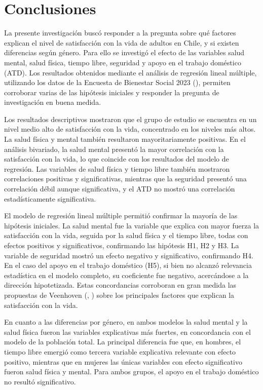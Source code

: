 \documentclass[
  spanish,
  a4paper,
  oneside]{scrbook}
\begin{document}

\chapter{Conclusiones}\label{conclusiones}

La presente investigación buscó responder a la pregunta sobre qué
factores explican el nivel de satisfacción con la vida de adultos en
Chile, y si existen diferencias según género. Para ello se investigó el
efecto de las variables salud mental, salud física, tiempo libre,
seguridad y apoyo en el trabajo doméstico (ATD). Los resultados
obtenidos mediante el análisis de regresión lineal múltiple, utilizando
los datos de la Encuesta de Bienestar Social 2023
(), permiten corroborar varias de las hipótesis iniciales y
responder la pregunta de investigación en buena medida.

Los resultados descriptivos mostraron que el grupo de estudio se
encuentra en un nivel medio alto de satisfacción con la vida,
concentrado en los niveles más altos. La salud física y mental también
resultaron mayoritariamente positivas. En el análisis bivariado, la
salud mental presentó la mayor correlación con la satisfacción con la
vida, lo que coincide con los resultados del modelo de regresión. Las
variables de salud física y tiempo libre también mostraron correlaciones
positivas y significativas, mientras que la seguridad presentó una
correlación débil aunque significativa, y el ATD no mostró una
correlación estadísticamente significativa.

El modelo de regresión lineal múltiple permitió confirmar la mayoría de
las hipótesis iniciales. La salud mental fue la variable que explica con
mayor fuerza la satisfacción con la vida, seguida por la salud física y
el tiempo libre, todas con efectos positivos y significativos,
confirmando las hipótesis H1, H2 y H3. La variable de seguridad mostró
un efecto negativo y significativo, confirmando H4. En el caso del apoyo
en el trabajo doméstico (H5), si bien no alcanzó relevancia estadística
en el modelo completo, su coeficiente fue negativo, acercándose a la
dirección hipotetizada. Estas concordancias corroboran en gran medida
las propuestas de Veenhoven (, ) sobre los principales
factores que explican la satisfacción con la vida.

En cuanto a las diferencias por género, en ambos modelos la salud mental
y la salud física fueron las variables explicativas más fuertes, en
concordancia con el modelo de la población total. La principal
diferencia fue que, en hombres, el tiempo libre emergió como tercera
variable explicativa relevante con efecto positivo, mientras que en
mujeres las únicas variables con efecto significativo fueron salud
física y mental. Para ambos grupos, el apoyo en el trabajo doméstico no
resultó significativo.
\end{document}
